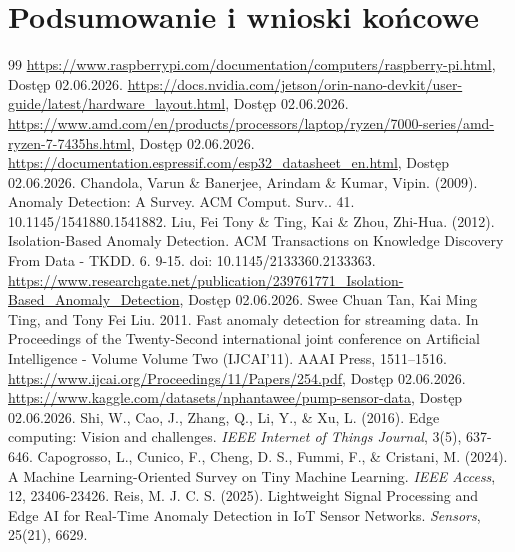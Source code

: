 \documentclass[12pt,twoside]{article}
\begin{document}
\section{Podsumowanie i wnioski końcowe}


\clearpage


\begin{thebibliography}{99}
 \url{https://www.raspberrypi.com/documentation/computers/raspberry-pi.html}, Dostęp 02.06.2026.
 \url{https://docs.nvidia.com/jetson/orin-nano-devkit/user-guide/latest/hardware_layout.html}, Dostęp 02.06.2026.
 \url{https://www.amd.com/en/products/processors/laptop/ryzen/7000-series/amd-ryzen-7-7435hs.html}, Dostęp 02.06.2026.
 \url{https://documentation.espressif.com/esp32\_datasheet\_en.html}, Dostęp 02.06.2026.
 Chandola, Varun \& Banerjee, Arindam \& Kumar, Vipin. (2009). Anomaly Detection: A Survey. ACM Comput. Surv.. 41. 10.1145/1541880.1541882.
Liu, Fei Tony \& Ting, Kai \& Zhou, Zhi-Hua. (2012). Isolation-Based Anomaly Detection. ACM Transactions on Knowledge Discovery From Data - TKDD. 6. 9-15. doi: 10.1145/2133360.2133363. 
\url{https://www.researchgate.net/publication/239761771\_Isolation-Based\_Anomaly\_Detection}, Dostęp 02.06.2026.
 Swee Chuan Tan, Kai Ming Ting, and Tony Fei Liu. 2011. Fast anomaly detection for streaming data. In Proceedings of the Twenty-Second international joint conference on Artificial Intelligence - Volume Volume Two (IJCAI'11). AAAI Press, 1511–1516.
\url{https://www.ijcai.org/Proceedings/11/Papers/254.pdf}, Dostęp 02.06.2026.
 \url{https://www.kaggle.com/datasets/nphantawee/pump-sensor-data}, Dostęp 02.06.2026.
 Shi, W., Cao, J., Zhang, Q., Li, Y., \& Xu, L. (2016). Edge computing: Vision and challenges. \textit{IEEE Internet of Things Journal}, 3(5), 637-646.
 Capogrosso, L., Cunico, F., Cheng, D. S., Fummi, F., \& Cristani, M. (2024). A Machine Learning-Oriented Survey on Tiny Machine Learning. \textit{IEEE Access}, 12, 23406-23426.
 Reis, M. J. C. S. (2025). Lightweight Signal Processing and Edge AI for Real-Time Anomaly Detection in IoT Sensor Networks. \textit{Sensors}, 25(21), 6629.
  
\end{thebibliography}

\clearpage
\end{document}
